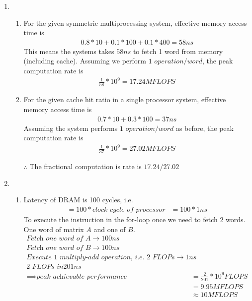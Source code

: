 \documentclass{article}
\begin{document}
\begin{enumerate}[label=\Large\textbf{\arabic*}.]
\item  
\begin{enumerate}[label={\arabic*}.]
	\item 
		For the given symmetric multiprocessing system, effective memory access time is 
		\begin{align*}
			0.8 * 10 + 0.1 * 100 + 0.1 * 400 = 58 ns
		\end{align*}
		This means the systems takes $58ns$ to fetch 1 word from memory (including cache).
		Assuming we perform $1$ $operation/word$, the peak computation rate is
		\begin{align*}
			\frac{1}{58} * 10^9 = 17.24MFLOPS
		\end{align*}
	\item
		For the given cache hit ratio in a single processor system, effective memory access time is
		\begin{align*}
			0.7 * 10 + 0.3 * 100 = 37ns
		\end{align*}
		Assuming the system performs $1$ $operation/word$ as before, the peak computation rate is 
		\begin{align*}
			\frac{1}{37} * 10 ^ 9 = 27.02 MFLOPS
		\end{align*}
		
		$\therefore$ The fractional computation is rate is $17.24 / 27.02$
\end{enumerate} 



\item
\begin{enumerate}[label={\arabic*}.]
	\item
	Latency of DRAM is 100 cycles, i.e. 
	\begin{align*}
		= 100 * \textit{clock cycle of processor}
		&= 100 * 1ns
	\end{align*}
	To execute the instruction in the for-loop once we need to fetch 2 words. One word of matrix $A$ and one of $B$. 
	\begin{align*}
		\textit{Fetch one word of A} \to100ns		
		\\\textit{Fetch one word of B} \to 100ns
		\\\textit{Execute 1 multiply-add operation, i.e. 2 FLOPs} \to 1ns
		\\\textit{2 FLOPs in} 201ns
		\\\implies \textit{peak achievable performance} &= \frac{2}{201} * 10^9 FLOPS
		\\&= 9.95 MFLOPS 
		\\&\approx 10 MFLOPS
	\end{align*}
	

\end{enumerate}
\end{enumerate}
\end{document}
